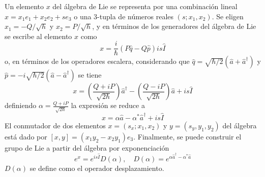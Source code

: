 Un elemento $x$ del álgebra de Lie se representa por una combinación lineal $x = x_1e_1 + x_2e_2 + s e_3$ o una 3-tupla de números reales $(s;x_1,x_2)$. Se eligen $x_1 = -Q/\sqrt{h}$ y $x_2 = P/\sqrt{h}$, y en términos de los generadores del álgebra de Lie se escribe al elemento $x$ como
\begin{equation*}
  x = \frac{i}{\hbar}(P\hat{q} - Q\hat{p}) is\hat{I}
\end{equation*}
o, en términos de los operadores escalera, considerando que $\hat{q} = \sqrt{\hbar/2}(\hat{a} + \hat{a}^{\dagger})$ y $\hat{p} = -i\sqrt{\hbar/2}(\hat{a} - \hat{a}^{\dagger})$
se tiene
\begin{equation*}
  x = \left( \frac{Q+iP}{\sqrt{2\hbar}} \right)\hat{a}^{\dagger} - \left( \frac{Q-iP}{\sqrt{2\hbar}} \right)\hat{a} + is\hat{I}
\end{equation*}
definiendo $\alpha =  \frac{Q+iP}{\sqrt{2\hbar}}$ la expresión se reduce a
\begin{equation*}
  x = \alpha\hat{a} - \alpha^* \hat{a}^{\dagger} + is\hat{I}
\end{equation*}
El conmutador de dos elementos $x = (s_x; x_1, x_2)$ y $y = (s_y, y_1, y_2)$ del álgebra está dado por $[x,y] = (x_1 y_2 - x_2 y_1)e_3$. Finalmente, se puede construir el grupo de Lie a partir del álgebra por exponenciación
\begin{equation*}
  e^{x} = e^{is\hat{I}}D(\alpha), \quad D(\alpha) = e^{\alpha\hat{a}^{\dagger} - \alpha^* \hat{a}}
\end{equation*}
$D(\alpha)$ se define como el operador desplazamiento.

